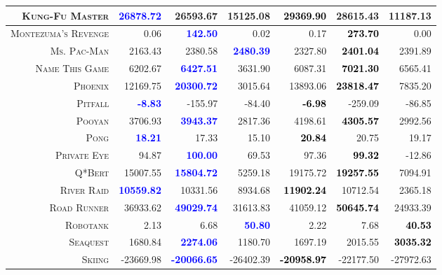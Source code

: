 \documentclass{article}
\begin{document}
{\begin{table}
{\begin{tabular}{|r|r|r|r||r|r|r|}
\hline
\textsc{Kung-Fu Master} & \textbf{\textcolor{blue}{26878.72}} & 26593.67 & 15125.08  & \textbf{\textcolor{black}{29369.90}} & 28615.43 & 11187.13  \\
\hline
\textsc{Montezuma's Revenge} & 0.06 & \textbf{\textcolor{blue}{142.50}} & 0.02  & 0.17 & \textbf{\textcolor{black}{273.70}} & 0.00  \\
\hline
\textsc{Ms. Pac-Man} & 2163.43 & 2380.58 & \textbf{\textcolor{blue}{2480.39}}  & 2327.80 & \textbf{\textcolor{black}{2401.04}} & 2391.89  \\
\hline
\textsc{Name This Game} & 6202.67 & \textbf{\textcolor{blue}{6427.51}} & 3631.90  & 6087.31 & \textbf{\textcolor{black}{7021.30}} & 6565.41  \\
\hline
\textsc{Phoenix} & 12169.75 & \textbf{\textcolor{blue}{20300.72}} & 3015.64  & 13893.06 & \textbf{\textcolor{black}{23818.47}} & 7835.20  \\
\hline
\textsc{Pitfall} & \textbf{\textcolor{blue}{-8.83}} & -155.97 & -84.40  & \textbf{\textcolor{black}{-6.98}} & -259.09 & -86.85  \\
\hline
\textsc{Pooyan} & 3706.93 & \textbf{\textcolor{blue}{3943.37}} & 2817.36  & 4198.61 & \textbf{\textcolor{black}{4305.57}} & 2992.56  \\
\hline
\textsc{Pong} & \textbf{\textcolor{blue}{18.21}} & 17.33 & 15.10  & \textbf{\textcolor{black}{20.84}} & 20.75 & 19.17  \\
\hline
\textsc{Private Eye} & 94.87 & \textbf{\textcolor{blue}{100.00}} & 69.53  & 97.36 & \textbf{\textcolor{black}{99.32}} & -12.86  \\
\hline
\textsc{Q*Bert} & 15007.55 & \textbf{\textcolor{blue}{15804.72}} & 5259.18  & 19175.72 & \textbf{\textcolor{black}{19257.55}} & 7094.91  \\
\hline
\textsc{River Raid} & \textbf{\textcolor{blue}{10559.82}} & 10331.56 & 8934.68  & \textbf{\textcolor{black}{11902.24}} & 10712.54 & 2365.18  \\
\hline
\textsc{Road Runner} & 36933.62 & \textbf{\textcolor{blue}{49029.74}} & 31613.83  & 41059.12 & \textbf{\textcolor{black}{50645.74}} & 24933.39  \\
\hline
\textsc{Robotank} & 2.13 & 6.68 & \textbf{\textcolor{blue}{50.80}}  & 2.22 & 7.68 & \textbf{\textcolor{black}{40.53}}  \\
\hline
\textsc{Seaquest} & 1680.84 & \textbf{\textcolor{blue}{2274.06}} & 1180.70  & 1697.19 & 2015.55 & \textbf{\textcolor{black}{3035.32}}  \\
\hline
\textsc{Skiing} & -23669.98 & \textbf{\textcolor{blue}{-20066.65}} & -26402.39  & \textbf{\textcolor{black}{-20958.97}} & -22177.50 & -27972.63  \\

\end{tabular}}
\end{table}}
\end{document}
